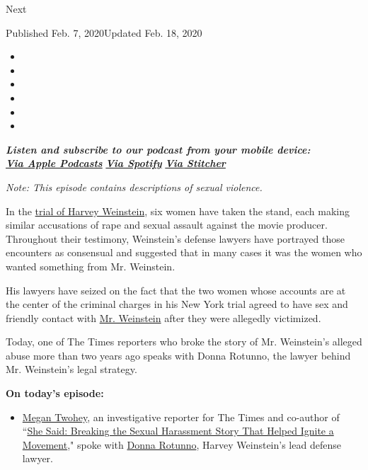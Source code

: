 Next

Published Feb. 7, 2020Updated Feb. 18, 2020

\begin{itemize}
\item
\item
\item
\item
\item
\item
\end{itemize}

\emph{\textbf{Listen and subscribe to our podcast from your mobile
device:}}\\
\textbf{\href{https://itunes.apple.com/us/podcast/the-daily/id1200361736?mt=2}{\emph{Via
Apple Podcasts}}} \emph{\textbf{\textbar{}}}
\textbf{\href{https://open.spotify.com/show/3IM0lmZxpFAY7CwMuv9H4g?si=SfuMSC55R1qprFsRZU3_zw}{\emph{Via
Spotify}}} \emph{\textbf{\textbar{}}}
\textbf{\href{http://www.stitcher.com/podcast/the-new-york-times/the-daily-10}{\emph{Via
Stitcher}}}

\emph{Note: This episode contains descriptions of sexual violence.}

In the
\href{https://www.nytimes.com/2020/02/18/nyregion/harvey-weinstein-trial-donna-rotunno.html}{trial
of Harvey Weinstein}, six women have taken the stand, each making
similar accusations of rape and sexual assault against the movie
producer. Throughout their testimony, Weinstein's defense lawyers have
portrayed those encounters as consensual and suggested that in many
cases it was the women who wanted something from Mr. Weinstein.

His lawyers have seized on the fact that the two women whose accounts
are at the center of the criminal charges in his New York trial agreed
to have sex and friendly contact with
\href{https://www.nytimes.com/2020/02/18/nyregion/harvey-weinstein-trial-donna-rotunno.html}{Mr.
Weinstein} after they were allegedly victimized.

Today, one of The Times reporters who broke the story of Mr. Weinstein's
alleged abuse more than two years ago speaks with Donna Rotunno, the
lawyer behind Mr. Weinstein's legal strategy.

\textbf{On today's episode:}

\begin{itemize}
\tightlist
\item
  \href{https://www.nytimes.com/by/megan-twohey}{Megan Twohey}, an
  investigative reporter for The Times and co-author of
  ``\href{https://www.nytimes.com/2019/09/08/books/review/she-said-jodi-kantor-megan-twohey.html?smid=pc-thedaily}{She
  Said: Breaking the Sexual Harassment Story That Helped Ignite a
  Movement}," spoke with
  \href{https://www.nytimes.com/search?query=donna+rotunno}{Donna
  Rotunno}, Harvey Weinstein's lead defense lawyer.
\end{itemize}

